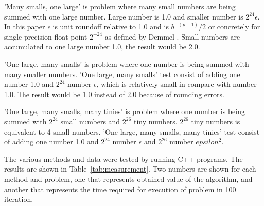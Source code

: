 \documentclass[conference]{IEEEtran}
\begin{document}
\par
'Many smalls, one large' is problem where many small numbers 
are being summed with one large number. 
Large number is 1.0 and smaller number is $2^{24} \epsilon$.
In this paper $\epsilon$ is unit roundoff relative to 1.0 and 
is $b^{-(p-1)}/2$ or concretely for single precision float point 
$2^{-24}$ as defined by Demmel \cite{DemmelsEpsilon}.
Small numbers are accumulated to one large number 1.0, the result would be 2.0.
\par
'One large, many smalls' is problem where one number 
is being summed with many smaller numbers. 'One large, many smalls' 
test consist of adding one number 1.0 and $2^{24}$ number $\epsilon$, 
which is relatively small in compare with number 1.0.
Тhe result would be 1.0 instead of 2.0 because of rounding errors.
\par
'One large, many smalls, many tinies' is problem where one 
number is being summed with $2^{24}$ small numbers and $2^{26}$
tiny numbers. $2^{26}$ tiny numbers is equivalent to 4 small numbers.
'One large, many smalls, many tinies' test consist of adding 
one number 1.0 and $2^{24}$ number $\epsilon$ and $2^{26}$ number 
$epsilon^2$.
\par
The various methods and data were tested by running C++ programs.
The results are shown in Table~\ref{tab:measurement}. 
Two numbers are shown for each method and problem, 
one that represents obtained value of the algorithm,
and another that represents the time required for execution of problem in 100 iteration.
\end{document}
